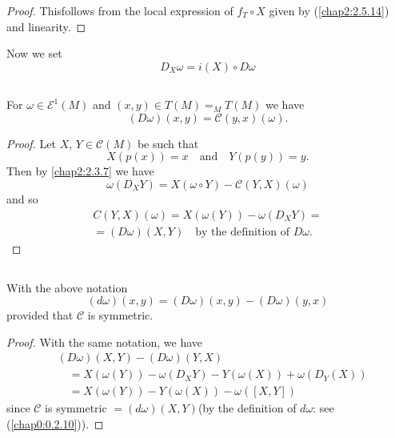 \begin{proof}
This\pageoriginale follows from the local expression of $f_{T}\circ X$
given by (\ref{chap2:2.5.14}) and linearity.
\end{proof}

Now we set
\begin{equation*}\label{chap2:2.4.8}
D_{X}\omega=i(X)\circ D\omega\tag{2.4.8}
\end{equation*}

\setcounter{subsection}{8}
\subsection{}\label{chap2:2.4.9}

\begin{prop*}
For $\omega\in\mathscr{E}^{1}(M)$ and $(x,y)\in
T(M){\displaystyle{\mathop{=}_{M}}}T(M)$ we have
$$
(D\omega)(x,y)=\mathcal{C}(y,x)(\omega).
$$
\end{prop*}

\begin{proof}
Let $X$, $Y\in\mathscr{C}(M)$ be such that
$$
X(p(x))=x\quad\text{and}\quad Y(p(y))=y.
$$
Then by \eqref{chap2:2.3.7} we have
$$
\omega(D_{X}Y)=X(\omega\circ Y)-\mathcal{C}(Y,X)(\omega)
$$
and so
\begin{gather*}
C(Y,X)(\omega)=X(\omega(Y))-\omega(D_{X}Y)=\\
=(D\omega)(X,Y)\quad\text{by the definition of } D\omega.
\end{gather*}
\end{proof}


\subsection{}\label{chap2:2.4.10}

\begin{lemma*}
With the above notation
$$
(d\omega)(x,y)=(D\omega)(x,y)-(D\omega)(y,x)
$$
provided that $\mathcal{C}$ is symmetric.
\end{lemma*}

\begin{proof}
With the same notation, we have
\begin{align*}
& (D\omega)(X,Y)-(D\omega)(Y,X)\\
&\quad =X(\omega(Y))-\omega(D_{X}Y)-Y(\omega(X))+\omega(D_{Y}(X))\\
&\quad =X(\omega(Y))-Y(\omega(X))-\omega([X,Y])
\end{align*}
since $\mathscr{C}$ is symmetric $=(d\omega)(X,Y)$\pageoriginale (by
the definition of $d\omega$: see ({\small\ref{chap0:0.2.10}})).
\end{proof}

